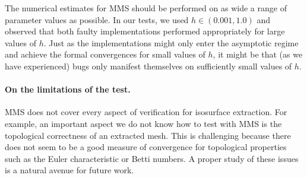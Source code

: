 The numerical estimates for MMS should be performed on as wide a range
of parameter values as possible. In our tests, we used 
$h \in (0.001, 1.0)$ and observed that both faulty implementations
performed appropriately for large values of $h$. Just as the
implementations might only enter the asymptotic regime and achieve the
formal convergences for small values of $h$, it might be that (as we
have experienced) bugs only manifest themselves on sufficiently small
values of $h$.




\paragraph*{On the limitations of the test.}
MMS does not cover every aspect of verification for
isosurface extraction. For example, an important aspect we do not
know how to test with MMS is the topological correctness of an
extracted mesh. This is challenging because there does not seem to
be a good measure of convergence for topological properties
such as the Euler characteristic or Betti numbers. A proper study of
these issues is a natural avenue for future work.

%
%

